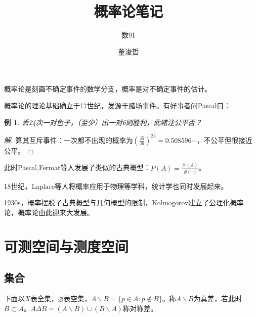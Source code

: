 \documentclass{ctexbook}
\title{概率论笔记}
\author{数91\and 董浚哲}
\begin{document}
\maketitle
\newcommand{\R}{\mathbb{R}}
\newcommand{\N}{\mathbb{N}}
\newcommand{\dd}{\,\mathrm{d}}
\newcommand{\st}{\text{ s.t. }}
\newcommand{\pp}[2]{\frac{\partial #1}{\partial #2}}
\newcommand{\dif}[2]{\frac{\mathrm{d}#1}{\mathrm{d}#2}}
\newcommand{\nm}[1]{\left\|#1\right\|}
\newcommand{\dual}[1]{\left<#1\right>}
\newcommand{\wto}{\rightharpoonup}
\newcommand{\wsto}{\stackrel{*}{\rightharpoonup}}
\newcommand{\cvin}{\text{ in }}
\newcommand{\alev}{\text{ a.e. }}
\newcommand{\alsu}{\text{ a.s. }}
\newcommand{\E}{\mathcal{E}}
\newcommand{\F}{\mathscr{F}}
\newcommand{\G}{\mathscr{G}}
\newcommand{\Bor}{\mathscr{B}}
\newcommand{\pw}{\text{ p.w. }}
\newcommand{\inof}{\text{ i.o. }}
\newcommand{\X}{\bm{X}}
\newcommand{\iid}{\mathrm{i.i.d.}~}
\newcommand{\C}{\mathbb{C}}


\newtheorem{Thm}{定理}[section]
\newtheorem{Lemma}[Thm]{引理}
\newtheorem{Prop}[Thm]{命题}
\newtheorem{Cor}[Thm]{推论}
\newtheorem{Def}{定义}[section]
\newtheorem{Rmk}{注}[section]
\newtheorem{Eg}{例}[section]
概率论是刻画不确定事件的数学分支，概率是对不确定事件的估计。

概率论的理论基础确立于17世纪，发源于赌场事件。有好事者问Pascal曰：
\begin{Eg}
  丢24次一对色子，（至少）出一对6则胜利，此赌注公平否？
\end{Eg}
\begin{proof}[解]
  算其互斥事件：一次都不出现的概率为$(\frac{35}{36})^{24}=0.508596\cdots$，不公平但很接近公平。
\end{proof}

此时Pascal,Fermat等人发展了类似的古典概型：$P(A)=\frac{\#(A)}{\#\{\cdots\}}$。

18世纪，Laplace等人将概率应用于物理等学科，统计学也同时发展起来。

1930s，概率摆脱了古典概型与几何概型的限制，Kolmogorov建立了公理化概率论，概率论由此迎来大发展。

\chapter{可测空间与测度空间}
\section{集合}
下面以$X$表全集，$\varnothing$表空集，$A\backslash B=\{p\in A:p\not \in B\}$。称$A\backslash B$为真差，若此时$B\subset A$。$A\Delta B=(A\backslash B)\cup(B\backslash A)$称对称差。
\end{document}
